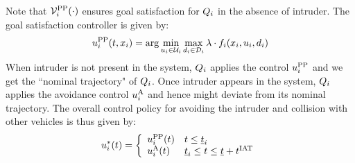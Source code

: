 Note that $\mathcal{V}^{\text{PP}}_{i}(\cdot)$ ensures goal satisfaction for $Q_i$ in the absence of intruder. The goal satisfaction controller is given by:
\begin{equation} \label{eqn:PPPolicy}
{\ctrl^{\text{PP}}_{i}}(t, \state_i) = \arg \min_{\ctrl_i \in \cset_i} \max_{\dstb_i \in \dset_i} \costate \cdot f_i (\state_i, \ctrl_i, \dstb_i)
\end{equation}
When intruder is not present in the system, $Q_i$ applies the control ${u^{\text{PP}}_{i}}$ and we get the ``nominal trajectory" of $Q_i$. Once intruder appears in the system, $Q_i$ applies the avoidance control ${u^{\text{A}}_i}$ and hence might deviate from its nominal trajectory. The overall control policy for avoiding the intruder and collision with other vehicles is thus given by:
\begin{equation} \label{eqn:final_nominalcontroller}
{\ctrl^*_{i}}(t) = 
\left \{ 
\begin{array}{ll}
{\ctrl^{\text{PP}}_{i}}(t) & t \leq \tsa_i\\
{\ctrl^{\text{A}}_{i}}(t) & \tsa_i \leq t \leq \tsa + \iat
\end{array}
\right.
\end{equation}

